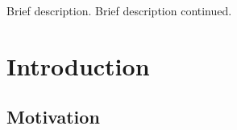 Brief description. Brief description continued.\section{Introduction}\label{index_intro_sec}
\subsection{Motivation}\label{index_mot_sec}
